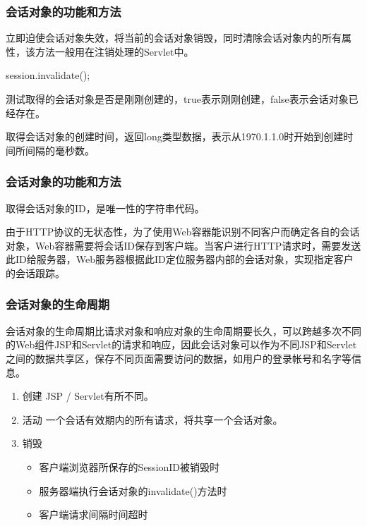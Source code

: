 \begin{frame}[fragile] %
\frametitle{会话对象的功能和方法} 


立即迫使会话对象失效，将当前的会话对象销毁，同时清除会话对象内的所有属性，该方法一般用在注销处理的Servlet中。
\begin{javaCode}
session.invalidate();
\end{javaCode}


测试取得的会话对象是否是刚刚创建的，true表示刚刚创建，false表示会话对象已经存在。


取得会话对象的创建时间，返回long类型数据，表示从1970.1.1.0时开始到创建时间所间隔的毫秒数。
\end{frame}

\begin{frame}[fragile] %
\frametitle{会话对象的功能和方法} 


取得会话对象的ID，是唯一性的字符串代码。

{\kai\Blue 由于HTTP协议的无状态性，为了使用Web容器能识别不同客户而确定各自的会话对象，Web容器需要将会话ID保存到客户端。当客户进行HTTP请求时，需要发送此ID给服务器，Web服务器根据此ID定位服务器内部的会话对象，实现指定客户的会话跟踪。}
\end{frame}

\begin{frame}[fragile] %
\frametitle{会话对象的生命周期} 

会话对象的生命周期比请求对象和响应对象的生命周期要长久，可以跨越多次不同的Web组件JSP和Servlet的请求和响应，因此会话对象可以作为不同JSP和Servlet之间的数据共享区，保存不同页面需要访问的数据，如用户的登录帐号和名字等信息。

\begin{enumerate}
\item {\hei 创建} JSP / Servlet有所不同。
\item {\hei 活动} 一个会话有效期内的所有请求，将共享一个会话对象。
\item {\hei 销毁} 
  \begin{itemize}
  \item 客户端浏览器所保存的SessionID被销毁时
  \item 服务器端执行会话对象的invalidate()方法时
  \item 客户端请求间隔时间超时
  \end{itemize}
\end{enumerate}
\end{frame}

